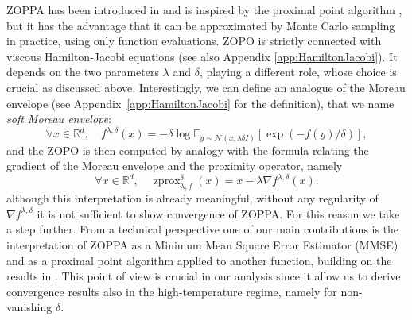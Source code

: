 \documentclass{article}
\newcommand{\R}{\mathbb{R}}
\newcommand{\E}{\mathbb{E}}
\newcommand{\zprox}{\ensuremath{\operatorname{zprox}}}
\begin{document}
\begin{algorithm}[H] 
\caption{ZOPPA: Zeroth-Order Proximal Point Algorithm} \label{alg:zoppa}
\begin{algorithmic}
  \STATE{{\bf Input:} $x^0 \in \R^d$, $\delta \in \R_{>0}$, $\lambda\in \R_{>0}$}
         \STATE{$x^{k + 1} = \zprox^{\delta}_{\lambda, f}(x^k)$}
     \ENDFOR
 \end{algorithmic}    
 \end{algorithm}
ZOPPA has been introduced in \cite{osher2023hamilton} and is inspired by the proximal point algorithm \cite{martinet1970regularisation,rockafellar1976monotone}, but it has the advantage that it can be approximated by Monte Carlo sampling in practice, using only function evaluations. ZOPO is strictly connected with viscous Hamilton-Jacobi equations (see also Appendix \ref{app:HamiltonJacobi}). It depends on the two parameters $\lambda$ and $\delta$, playing a different role, whose choice is crucial as discussed above. Interestingly, we can define an analogue of the Moreau envelope (see Appendix~\ref{app:HamiltonJacobi} for the definition), that we name \emph{soft Moreau envelope}:
\[\forall x\in\R^d,\quad f^{\lambda,\delta}(x)=-\delta \log \E_{y\sim\mathcal N(x,\lambda\delta I)}
\left[
\exp\left(-f(y)/\delta\right)
\right],\]
and the ZOPO is then computed by analogy with the formula relating the gradient of the Moreau envelope and the proximity operator, namely
\[\forall x \in\R^d,\quad \zprox^{\delta}_{\lambda, f}(x)=x-\lambda\nabla f^{\lambda,\delta}(x).\]
although this interpretation is already meaningful, without any regularity of $\nabla f^{\lambda,\delta}$ it is not sufficient to show convergence of ZOPPA. For this reason we take a step further. From a technical perspective one of our main contributions is the interpretation of ZOPPA as a Minimum Mean Square Error Estimator (MMSE) and as a proximal point algorithm applied to another function, building on the results in \cite{Gribonval11}. This point of view is crucial in our analysis since it allow us to derive convergence results also in the high-temperature regime, namely for non-vanishing $\delta$. 
\end{document}
